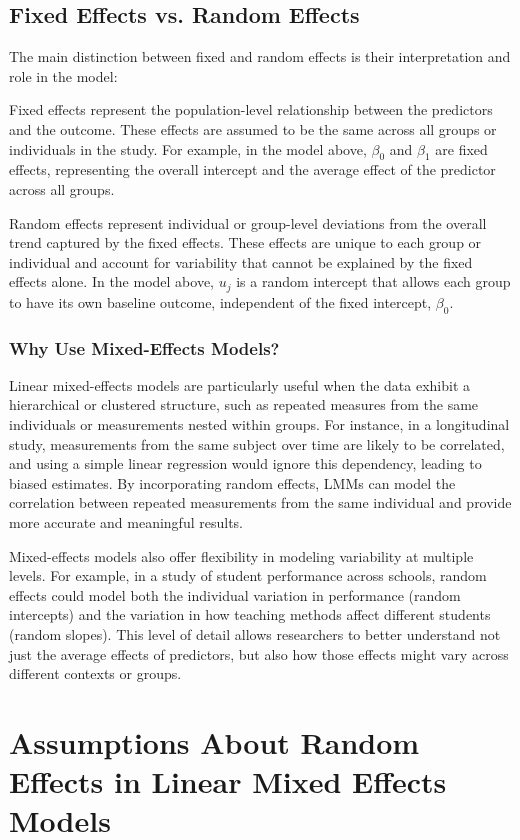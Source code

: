 \subsection*{Fixed Effects vs. Random Effects}
The main distinction between fixed and random effects is their interpretation and role in the model:

Fixed effects represent the population-level relationship between the predictors and the outcome. These effects are assumed to be the same across all groups or individuals in the study. For example, in the model above, $\beta_0$ and $\beta_1$ are fixed effects, representing the overall intercept and the average effect of the predictor across all groups.

Random effects represent individual or group-level deviations from the overall trend captured by the fixed effects. These effects are unique to each group or individual and account for variability that cannot be explained by the fixed effects alone. In the model above, $u_j$ is a random intercept that allows each group to have its own baseline outcome, independent of the fixed intercept, $\beta_0$.

\subsubsection*{Why Use Mixed-Effects Models?}
Linear mixed-effects models are particularly useful when the data exhibit a hierarchical or clustered structure, such as repeated measures from the same individuals or measurements nested within groups. For instance, in a longitudinal study, measurements from the same subject over time are likely to be correlated, and using a simple linear regression would ignore this dependency, leading to biased estimates. By incorporating random effects, LMMs can model the correlation between repeated measurements from the same individual and provide more accurate and meaningful results.

Mixed-effects models also offer flexibility in modeling variability at multiple levels. For example, in a study of student performance across schools, random effects could model both the individual variation in performance (random intercepts) and the variation in how teaching methods affect different students (random slopes). This level of detail allows researchers to better understand not just the average effects of predictors, but also how those effects might vary across different contexts or groups.

\section{Assumptions About Random Effects in Linear Mixed Effects Models}

